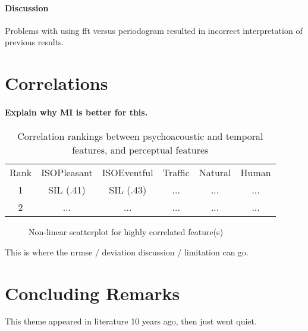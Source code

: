 \paragraph{Discussion} Problems with using fft versus periodogram resulted in incorrect interpretation of previous results.


\section{Correlations}

\paragraph{Explain why MI is better for this.}

\begin{table}[]
  \centering
  \begin{tabular}{c|c|c|c|c|c}
    Rank & ISOPleasant & ISOEventful & Traffic & Natural & Human \\
    1    & SIL (.41)   & SIL (.43)   & ...     & ...     & ...   \\
    2    & ...         & ...         & ...     & ...     & ...   \\
  \end{tabular}
  \caption{Correlation rankings between psychoacoustic and temporal features, and perceptual features}
  \label{tab:my_label}
\end{table}

\begin{figure}
  \centering
  \caption{Non-linear scatterplot for highly correlated feature(s)}
  \label{fig:scatterplot}
\end{figure}

This is where the nrmse / deviation discussion / limitation can go.

\section{Concluding Remarks}

This theme appeared in literature 10 years ago, then just went quiet.

